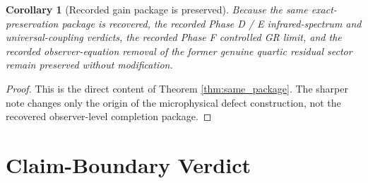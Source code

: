 \documentclass[11pt]{article}
\newtheorem{corollary}{Corollary}
\begin{document}
\begin{corollary}[Recorded gain package is preserved]
\label{cor:gains}
Because the same exact-preservation package is recovered, the recorded Phase D / E infrared-spectrum and universal-coupling verdicts, the recorded Phase F controlled GR limit, and the recorded observer-equation removal of the former genuine quartic residual sector remain preserved without modification.
\end{corollary}

\begin{proof}
This is the direct content of Theorem \ref{thm:same_package}. The sharper note changes only the origin of the microphysical defect construction, not the recovered observer-level completion package.
\end{proof}

\section{Claim-Boundary Verdict}
\end{document}
